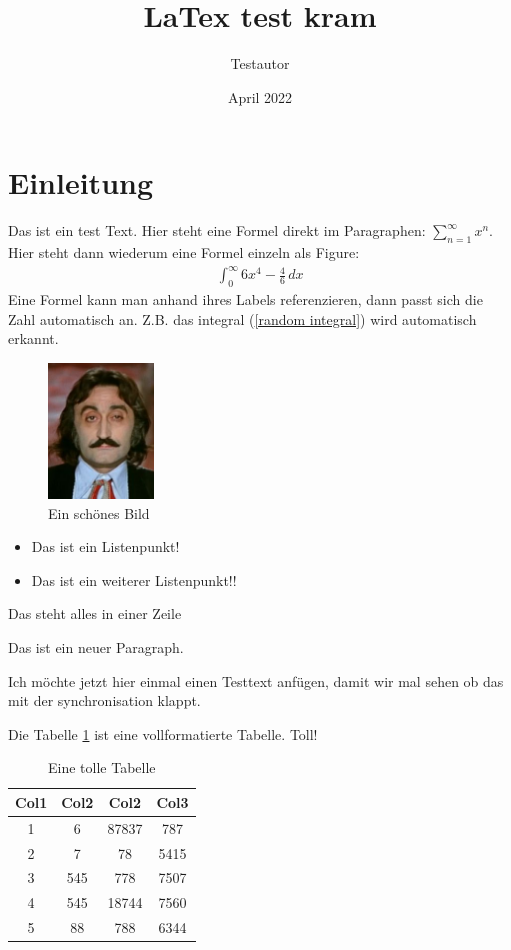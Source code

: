 \documentclass[12pt]{article}
\title{LaTex test kram}
\author{Testautor}
\date{April 2022}
\begin{document}
\maketitle

\pagebreak
\section{Einleitung}
Das ist ein test Text. Hier steht eine Formel direkt im Paragraphen: 
$\sum_{n = 1}^{\infty} x^n$. Hier steht dann wiederum eine Formel einzeln als Figure:
\begin{align}
  \int_{0}^{\infty} 6x^4-\frac{4}{6} \,dx \label{random integral}
\end{align}
Eine Formel kann man anhand ihres Labels referenzieren, dann passt sich
die Zahl automatisch an. Z.B. das integral (\ref{random integral}) wird automatisch
erkannt. \linebreak

\begin{figure}[h]
  \centering
  \includegraphics[width=0.25\textwidth]{Bilder/Unvernichtet.jpg}
  \caption{Ein schönes Bild}
  \label{fig:mesh1}
\end{figure}

\begin{itemize}
  \item Das ist ein Listenpunkt!
  \item Das ist ein weiterer Listenpunkt!!
\end{itemize}
Das steht alles in
einer Zeile

Das ist ein neuer Paragraph.

Ich möchte jetzt hier einmal einen Testtext anfügen, damit wir mal sehen ob das mit der synchronisation klappt.
\pagebreak

Die Tabelle \ref{table:data} ist eine vollformatierte Tabelle. Toll!
\begin{table}[h!]
  \centering
  \begin{tabular}{||c c c c||} 
  \hline
  Col1 & Col2 & Col2 & Col3 \\ [0.5ex] 
  \hline\hline
  1 & 6 & 87837 & 787 \\ 
  2 & 7 & 78 & 5415 \\
  3 & 545 & 778 & 7507 \\
  4 & 545 & 18744 & 7560 \\
  5 & 88 & 788 & 6344 \\ [1ex] 
  \hline
  \end{tabular}
  \caption{Eine tolle Tabelle}
  \label{table:data}
\end{table}
\end{document}
